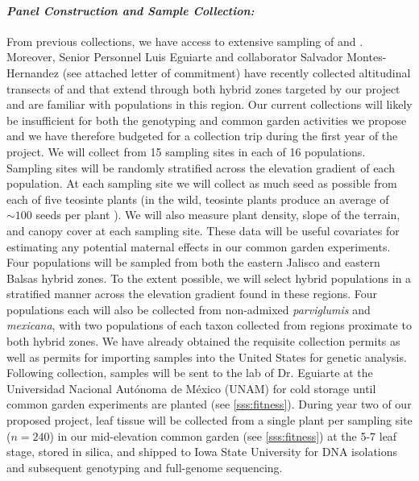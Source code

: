\paragraph{\emph{Panel Construction and Sample Collection:}}
From previous collections, we have access to extensive sampling of \zm{} and \zp{}.
Moreover, Senior Personnel Luis Eguiarte and collaborator Salvador Montes-Hernandez (see attached letter of commitment) have recently collected altitudinal transects of \zp{} and \zm{} that extend through both hybrid zones targeted by our project \citep{Diez2013} and are  familiar with populations in this region.
Our current collections will likely be insufficient for both the genotyping and common garden activities we propose and we have therefore budgeted for a collection trip during the first year of the project.
We will collect from 15 sampling sites in each of 16 populations.
Sampling sites will be randomly stratified across the elevation gradient of each population.
At each sampling site we will collect as much seed as possible from each of five teosinte plants (in the wild, teosinte plants produce an average of $\sim 100$ seeds per plant \citep{wilkes1967teosinte}). 
We will also measure plant density, slope of the terrain, and canopy cover at each sampling site.  These data will be useful covariates for estimating any potential maternal effects in our common garden experiments.  Four populations will be sampled from both the eastern Jalisco and eastern Balsas hybrid zones.  To the extent possible, we will select hybrid populations in a stratified manner across the elevation gradient found in these regions. Four populations each will also be collected from non-admixed \emph{parviglumis} and \emph{mexicana}, with two populations of each taxon collected from regions proximate to both hybrid zones.  We have already obtained the requisite collection permits as well as permits for importing samples into the United States for genetic analysis. Following collection, samples will be sent to the lab of Dr. Eguiarte at the Universidad Nacional Aut\'{o}noma de M\'{e}xico (UNAM) for cold storage until common garden experiments are planted (see \ref{sss:fitness}).  During year two of our proposed project, leaf tissue will be collected from a single plant per sampling site ($n=240$) in our mid-elevation common garden (see \ref{sss:fitness}) at the 5-7 leaf stage, stored in silica, and shipped to Iowa State University for DNA isolations and subsequent genotyping and full-genome sequencing.

